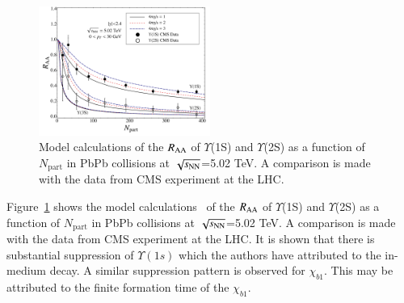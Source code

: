 {{\begin{figure}[t]
\begin{center}
\includegraphics[width=0.5\textwidth]{Figures/CMS-SB.pdf}
\end{center}
\vspace{-7mm}
\caption{Model calculations \cite{Krouppa:2018lkt} of the $R_{\rm AA}$
  of $\Upsilon$(1S) and $\Upsilon$(2S) as a function of $N_{\text{part}}$
  in PbPb collisions at $\sqrt{s_{\rm NN}}$=5.02 TeV.   
  A comparison is made with the data from CMS experiment \cite{Sirunyan:2018nsz} at
  the LHC.}
\label{fig:raasep}
\end{figure}

Figure~\ref{fig:raasep} shows the model calculations~\cite{Krouppa:2018lkt}
of the $R_{\rm AA}$ of $\Upsilon$(1S) and $\Upsilon$(2S) as a function of
$N_{\text{part}}$  in PbPb collisions at $\sqrt{s_{\rm NN}}$=5.02 TeV.   
  A comparison is made with the data from CMS experiment \cite{Sirunyan:2018nsz} at
  the LHC. It is shown that there is substantial 
suppression  of $\Upsilon(1s)$ which the authors have attributed to the in-medium decay.  
A  similar suppression pattern is observed for $\chi_{b1}$.
This may be attributed to the finite formation time of the $\chi_{b1}$. 





}}
